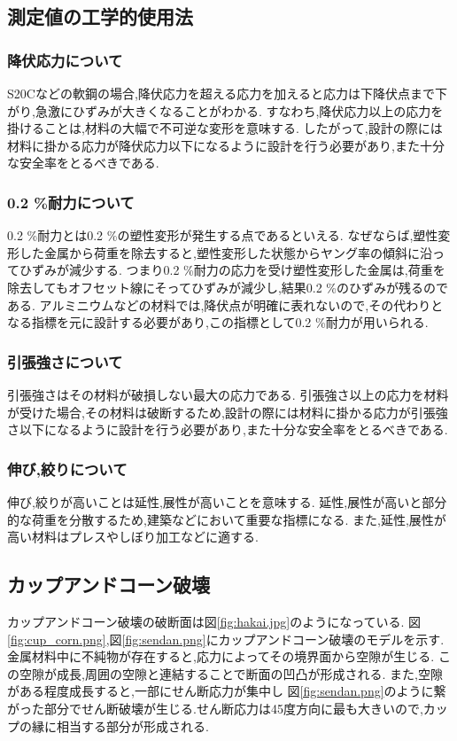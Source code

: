 \subsection{測定値の工学的使用法}
\subsubsection{降伏応力について}
S20Cなどの軟鋼の場合,降伏応力を超える応力を加えると応力は下降伏点まで下がり,急激にひずみが大きくなることがわかる.
すなわち,降伏応力以上の応力を掛けることは,材料の大幅で不可逆な変形を意味する.
したがって,設計の際には材料に掛かる応力が降伏応力以下になるように設計を行う必要があり,また十分な安全率をとるべきである.
\subsubsection{0.2 \%耐力について}
0.2 \%耐力とは0.2 \%の塑性変形が発生する点であるといえる.
なぜならば,塑性変形した金属から荷重を除去すると,塑性変形した状態からヤング率の傾斜に沿ってひずみが減少する.
つまり0.2 \%耐力の応力を受け塑性変形した金属は,荷重を除去してもオフセット線にそってひずみが減少し,結果0.2 \%のひずみが残るのである.
アルミニウムなどの材料では,降伏点が明確に表れないので,その代わりとなる指標を元に設計する必要があり,この指標として0.2 \%耐力が用いられる.
\subsubsection{引張強さについて}
引張強さはその材料が破損しない最大の応力である.
引張強さ以上の応力を材料が受けた場合,その材料は破断するため,設計の際には材料に掛かる応力が引張強さ以下になるように設計を行う必要があり,また十分な安全率をとるべきである.
\subsubsection{伸び,絞りについて\cite{hippari}}
伸び,絞りが高いことは延性,展性が高いことを意味する.
延性,展性が高いと部分的な荷重を分散するため,建築などにおいて重要な指標になる.
また,延性,展性が高い材料はプレスやしぼり加工などに適する.
\subsection{カップアンドコーン破壊\cite{hakai}}
カップアンドコーン破壊の破断面は図\ref{fig:hakai.jpg}のようになっている.
図\ref{fig:cup_corn.png},図\ref{fig:sendan.png}にカップアンドコーン破壊のモデルを示す.
金属材料中に不純物が存在すると,応力によってその境界面から空隙が生じる.
この空隙が成長,周囲の空隙と連結することで断面の凹凸が形成される.
また,空隙がある程度成長すると,一部にせん断応力が集中し
図\ref{fig:sendan.png}のように繋がった部分でせん断破壊が生じる.せん断応力は45度方向に最も大きいので,カップの縁に相当する部分が形成される.

